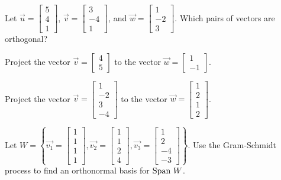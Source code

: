\documentclass[12pt]{exam}
\begin{document}
\begin{questions}
\question
Let $\vec{u} = \left[ \begin{array}{c} 5 \\ 4 \\ 1 \end{array} \right]$,
$\vec{v} = \left[ \begin{array}{c} 3 \\ -4 \\ 1 \end{array} \right]$, and 
$\vec{w} = \left[ \begin{array}{c} 1 \\ -2 \\ 3 \end{array} \right]$. Which pairs of vectors are orthogonal? 

\question
Project the vector $\vec{v} = \left[ \begin{array}{c} 4 \\ 5 \end{array} \right]$ to the vector
$\vec{w} = \left[ \begin{array}{c} 1 \\ -1 \end{array} \right]$.

\clearpage

\question
Project the vector $\vec{v} = \left[ \begin{array}{c} 1\\ -2 \\ 3 \\ -4 \end{array} \right]$ to the vector
$\vec{w} = \left[ \begin{array}{c} 1 \\ 2 \\ 1 \\ 2 \end{array} \right]$.

\question
Let $W = \left\lbrace 
\vec{v_1} = \left[ \begin{array}{c} 1 \\ 1 \\ 1 \\ 1 \end{array} \right],
\vec{v_2} = \left[ \begin{array}{c} 1 \\ 1 \\ 2 \\ 4 \end{array} \right],
\vec{v_3} = \left[ \begin{array}{c} 1 \\ 2 \\ -4 \\ -3 \end{array} \right]
\right\rbrace$.  Use the Gram-Schmidt process to \smallskip
\newline 
find an orthonormal basis for $\textnormal{Span } W$.

\end{questions}
\end{document}
